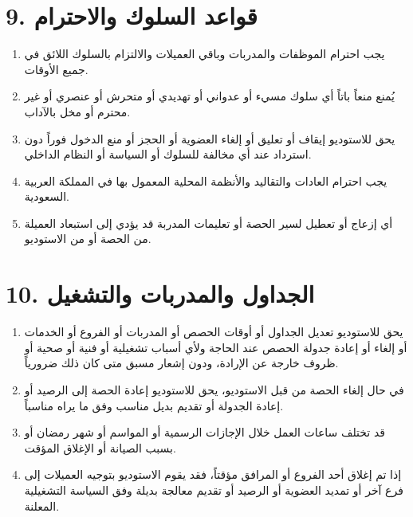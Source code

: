 \documentclass[12pt,a4paper]{article}
\begin{document}
\section*{9. قواعد السلوك والاحترام}
\begin{enumerate}
    \item يجب احترام الموظفات والمدربات وباقي العميلات والالتزام بالسلوك اللائق في جميع الأوقات.
    \item يُمنع منعاً باتاً أي سلوك مسيء أو عدواني أو تهديدي أو متحرش أو عنصري أو غير محترم أو مخل بالآداب.
    \item يحق للاستوديو إيقاف أو تعليق أو إلغاء العضوية أو الحجز أو منع الدخول فوراً دون استرداد عند أي مخالفة للسلوك أو السياسة أو النظام الداخلي.
    \item يجب احترام العادات والتقاليد والأنظمة المحلية المعمول بها في المملكة العربية السعودية.
    \item أي إزعاج أو تعطيل لسير الحصة أو تعليمات المدربة قد يؤدي إلى استبعاد العميلة من الحصة أو من الاستوديو.
\end{enumerate}

\section*{10. الجداول والمدربات والتشغيل}
\begin{enumerate}
    \item يحق للاستوديو تعديل الجداول أو أوقات الحصص أو المدربات أو الفروع أو الخدمات أو إلغاء أو إعادة جدولة الحصص عند الحاجة ولأي أسباب تشغيلية أو فنية أو صحية أو ظروف خارجة عن الإرادة، ودون إشعار مسبق متى كان ذلك ضرورياً.
    \item في حال إلغاء الحصة من قبل الاستوديو، يحق للاستوديو إعادة الحصة إلى الرصيد أو إعادة الجدولة أو تقديم بديل مناسب وفق ما يراه مناسباً.
    \item قد تختلف ساعات العمل خلال الإجازات الرسمية أو المواسم أو شهر رمضان أو بسبب الصيانة أو الإغلاق المؤقت.
    \item إذا تم إغلاق أحد الفروع أو المرافق مؤقتاً، فقد يقوم الاستوديو بتوجيه العميلات إلى فرع آخر أو تمديد العضوية أو الرصيد أو تقديم معالجة بديلة وفق السياسة التشغيلية المعلنة.
\end{enumerate}
\end{document}
